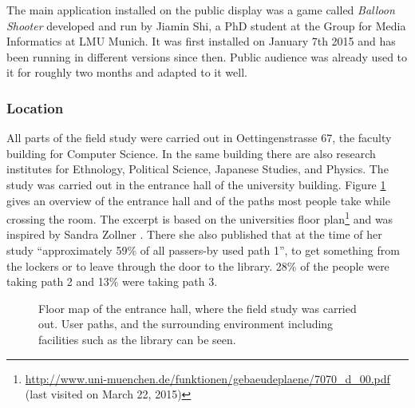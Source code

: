 

		The main application installed on the public display was a game called \textit{Balloon Shooter} developed and run by Jiamin Shi, a PhD student at the Group for Media Informatics at LMU Munich. It was first installed on January 7th 2015 and has been running in different versions since then. Public audience was already used to it for roughly two months and adapted to it well.





	\subsubsection{Location}

	All parts of the field study were carried out in Oettingenstrasse 67, the faculty building for Computer Science. In the same building there are also research institutes for Ethnology, Political Science, Japanese Studies, and Physics. The study was carried out in the entrance hall of the university building. Figure \ref{fig:5-entrance-hall} gives an overview of the entrance hall and of the paths most people take while crossing the room. The excerpt is based on the universities floor plan\footnote{\url{http://www.uni-muenchen.de/funktionen/gebaeudeplaene/7070_d_00.pdf} (last visited on March 22, 2015)} and was inspired by Sandra Zollner \cite{zollner2014thesis}. There she also published that at the time of her study ``approximately 59\% of all passers-by used path 1'', to get something from the lockers or to leave through the door to the library. 28\% of the people were taking path 2 and 13\% were taking path 3.

	\begin{figure}
	    \begin{center}
	    \end{center}
	 \caption[Floor Map of Entrance Hall]{Floor map of the entrance hall, where the field study was carried out. User paths, and the surrounding environment including facilities such as the library can be seen.}
	 \label{fig:5-entrance-hall}
	\end{figure}

